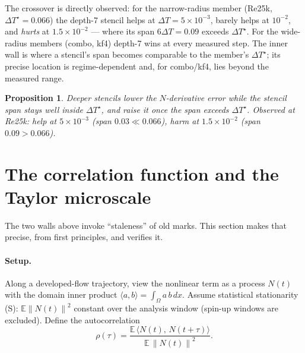 \documentclass[11pt]{article}
\newtheorem{proposition}{Proposition}
\theoremstyle{remark}
\newcommand{\DT}{\Delta T}
\newcommand{\DTs}{\Delta T^{\star}}
\newcommand{\norm}[1]{\left\lVert #1 \right\rVert}
\begin{document}
The crossover is directly observed: for the narrow-radius member (Re25k,
$\DTs = 0.066$) the depth-7 stencil helps at $\DT = 5\times10^{-3}$, barely
helps at $10^{-2}$, and \emph{hurts} at $1.5\times10^{-2}$ --- where its span
$6\DT = 0.09$ exceeds $\DTs$. For the wide-radius members (combo, kf4)
depth-7 wins at every measured step. The inner wall is where a stencil's
span becomes comparable to the member's $\DTs$; its precise location is
regime-dependent and, for combo/kf4, lies beyond the measured range.

\begin{proposition}\label{prop:inner}
Deeper stencils lower the $N$-derivative error while the stencil span stays
well inside $\DTs$, and raise it once the span exceeds $\DTs$. Observed at
Re25k: help at $5\times10^{-3}$ (span $0.03 \ll 0.066$), harm at
$1.5\times10^{-2}$ (span $0.09 > 0.066$).
\end{proposition}

\section{The correlation function and the Taylor microscale}\label{sec:decorr}

The two walls above invoke ``staleness'' of old marks. This section makes
that precise, from first principles, and verifies it.

\paragraph{Setup.}
Along a developed-flow trajectory, view the nonlinear term as a process
$N(t)$ with the domain inner product $\langle a,b\rangle = \int_\Omega a\,b\,dx$.
Assume statistical stationarity (S): $\mathbb{E}\norm{N(t)}^2$ constant over
the analysis window (spin-up windows are excluded). Define the
autocorrelation
\begin{equation}
\rho(\tau) = \frac{\mathbb{E}\,\langle N(t),\,N(t+\tau)\rangle}
                  {\mathbb{E}\,\norm{N(t)}^2}.
\end{equation}
\end{document}
